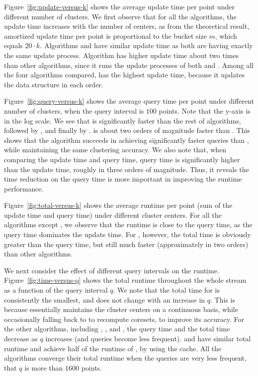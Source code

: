  Figure~\ref{fig:update-versus-k} shows the average
update time per point under different number of clusters. 
We first observe that for all the algorithms, the update time increases with the number of centers, 
as from the theoretical result, amortized update time per point is proportional to the bucket size $m$, 
which equals $20 \cdot k$. 
Algorithms \skmpp and \cc have similar update time as both are having exactly the same update process. 
Algorithm \hybrid has higher update time about two times than other algorithms, 
since it runs the update processes of both \seqkm and \skmpp.
Among all the four algorithms compared, \rcc has the highest update time, 
because it updates the \rcc data structure in each order.

 Figure~\ref{fig:query-versus-k} shows 
the average query time per point under different number of clusters, 
when the query interval is $100$ points.  Note that the y-axis is in the log scale. 
We see that \hybrid is significantly faster than the rest of algorithms, 
followed by \rcc,  \cc and finally by \skmpp.
\hybrid is about two orders of magnitude faster than \skmpp. 
This shows that the algorithm succeeds in achieving significantly 
faster queries than \skmpp, while maintaining the same clustering accuracy. 
We also note that, when comparing the update time and query time, query time is 
significantly higher than the update time, roughly in three orders of magnitude. 
Thus, it reveals the time reduction on the query time is more important in improving 
the runtime performance. 

 Figure~\ref{fig:total-versus-k} shows the average
runtime per point (sum of the update time and query time) under different cluster centers. 
For all the algorithms except \hybrid, we observe that the runtime 
is close to the query time, as the query time dominates the update time. 
For \hybrid, however, the total time is obviously greater than the query time, 
but still much faster (approximately in two orders) than other algorithms.

We next consider the effect of different query intervals on the runtime. 
Figure~\ref{fig:time-versus-q} shows the total runtime throughout the 
whole stream as a function of the query interval $q$. 
We note that the total time for \hybrid is consistently the smallest, and does not
change with an increase in $q$. This is because \hybrid essentially maintains
the cluster centers on a continuous basis, while occasionally falling back to
\cc to recompute coresets, to improve its accuracy. For the other algorithms,
including \cc, \rcc, and \skmpp, the query time and the total time decrease as
$q$ increases (and queries become less frequent).
\cc and \rcc have similar total runtime and achieve half of the runtime of \skmpp, 
by using the cache. 
All the algorithms converge their total runtime when the queries are very less frequent,
that $q$ is more than $1600$ points.

